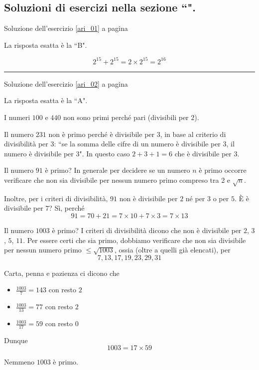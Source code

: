 

\subsection{Soluzioni di esercizi nella sezione ``\textbf{}".}

Soluzione dell'esercizio \ref{ari_01} a pagina \pageref{ari_01}\label{aris_01}

La risposta esatta è la ``B".

\begin{equation*}
2^{15} + 2^{15} = 2 \times 2^{15} = 2^{16}
\end{equation*}


\vspace{1cm}
\hrule
\vspace{1cm}


Soluzione dell'esercizio \ref{ari_02} a pagina \pageref{ari_02}\label{aris_02}

La risposta esatta è la ``A".

I numeri $100$ e $440$ non sono primi perché pari (divisibili per $2$).


Il numero $231$ non è primo perché è divisibile per $3$, in base al criterio di divisibilità per
3: ``se la somma delle cifre di un numero è divisibile per 3, il numero è divisibile per 3".  In questo 
caso $2 + 3 + 1 = 6$ che è divisibile per 3.

Il numero $91$ è primo?
In generale per decidere se un numero $n$ è primo occorre veriﬁcare che non sia divisibile per nessun numero 
primo compreso tra 2 e $\sqrt{n}$.

Inoltre, per i criteri di divisibilità, $91$ non è divisibile per $2$ né per $3$ o per $5$.
È è divisibile per $7$?
Sì, perché
\begin{equation*}
 91 = 70 + 21 = 7 \times 10 + 7 \times 3 = 7 \times 13
\end{equation*}

Il numero $1003$ è primo? I criteri di divisibilità dicono che non è divisibile per $2$, $3$, $5$, $11$.
Per essere certi che sia primo, dobbiamo veriﬁcare che non sia divisibile per nessun numero
primo $\leq \sqrt{1003}$, ossia (oltre a quelli già elencati), per
\begin{equation*}
7, 13, 17, 19, 23, 29, 31
\end{equation*}

Carta, penna e pazienza ci dicono che
\begin{itemize}
\item $\frac{1003}{7}= 143$ con resto $2$
\item $\frac{1003}{13} = 77$ con resto $2$
\item $\frac{1003}{17} = 59$ con resto $0$
\end{itemize}

Dunque 
\begin{equation*}
1003 = 17 \times 59
\end{equation*}

Nemmeno $1003$ è primo. 

